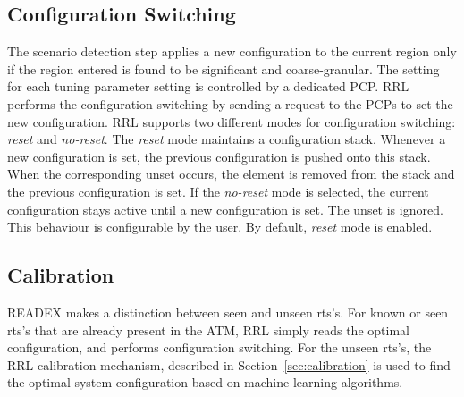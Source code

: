 \subsection{Configuration Switching}\label{config-switching}
The scenario detection step applies a new configuration to the current region only if the region entered is found to be significant and coarse-granular. The setting for each tuning parameter setting is controlled by a dedicated PCP. RRL performs the configuration switching by sending a request to the PCPs to set the new configuration. RRL supports two different modes for configuration switching: \textit{reset} and \textit{no-reset}. The \textit{reset} mode maintains a configuration stack. Whenever a new configuration is set, the previous configuration is pushed onto this stack. When the corresponding unset occurs, the element is removed from the stack and the previous configuration is set. If the \textit{no-reset} mode is selected, the current configuration stays active until a new configuration is set. The unset is ignored. This behaviour is configurable by the user. By default, \textit{reset} mode is enabled.

\subsection{Calibration}\label{calibr}
READEX makes a distinction between seen and unseen rts's. For known or seen rts's that are already present in the ATM, RRL simply reads the optimal configuration, and performs configuration switching. For the unseen rts's, the RRL calibration mechanism, described in Section~\ref{sec:calibration} is used to find the optimal system configuration based on machine learning algorithms.

 

 